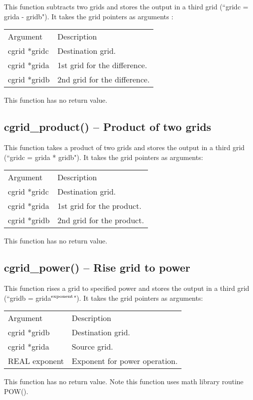 \documentclass[12pt,letterpaper]{report}
\begin{document}
This function subtracts two grids and stores the output in a third grid (``gridc = grida - gridb"). It takes the grid pointers as arguments :
\begin{longtable}{p{} p{}}
Argument & Description\\
\cline{1-2}
cgrid *gridc & Destination grid.\\
cgrid *grida & 1st grid for the difference.\\
cgrid *gridb & 2nd grid for the difference.\\
\end{longtable}
\noindent
This function has no return value.

\subsection{cgrid\_product() -- Product of two grids}

This function takes a product of two grids and stores the output in a third grid (``gridc = grida * gridb"). It takes the grid pointers as arguments:
\begin{longtable}{p{} p{}}
Argument & Description\\
\cline{1-2}
cgrid *gridc & Destination grid.\\
cgrid *grida & 1st grid for the product.\\
cgrid *gridb & 2nd grid for the product.\\
\end{longtable}
\noindent
This function has no return value.

\subsection{cgrid\_power() -- Rise grid to power}

This function rises a grid to specified power and stores the output in a third grid (``gridb = grida$^\textnormal{exponent}$"). It takes the grid pointers as arguments:
\begin{longtable}{p{} p{}}
Argument & Description\\
\cline{1-2}
cgrid *gridb & Destination grid.\\
cgrid *grida & Source grid.\\
REAL exponent & Exponent for power operation.\\
\end{longtable}
\noindent
This function has no return value. Note this function uses math library routine POW().
\end{document}
